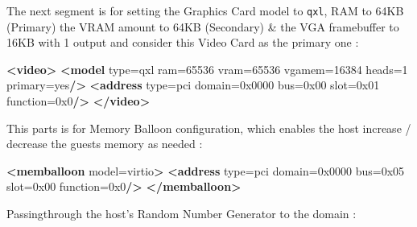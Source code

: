 \documentclass[
  14pt,
  english,
  a4paper,
]{scrreprt}
\newenvironment{Shaded}{}{}
\newcommand{\KeywordTok}[1]{\textcolor[rgb]{0.00,0.44,0.13}{\textbf{#1}}}
\newcommand{\OtherTok}[1]{\textcolor[rgb]{0.00,0.44,0.13}{#1}}
\newcommand{\StringTok}[1]{\textcolor[rgb]{0.25,0.44,0.63}{#1}}
\begin{document}
The next segment is for setting the Graphics Card model to \texttt{qxl},
RAM to 64KB (Primary) the VRAM amount to 64KB (Secondary) \& the VGA
framebuffer to 16KB with 1 output and consider this Video Card as the
primary one :

\begin{Shaded}
\begin{Highlighting}[]
\KeywordTok{\textless{}video\textgreater{}}
  \KeywordTok{\textless{}model}\OtherTok{ type=}\StringTok{\textquotesingle{}qxl\textquotesingle{}}\OtherTok{ ram=}\StringTok{\textquotesingle{}65536\textquotesingle{}}\OtherTok{ vram=}\StringTok{\textquotesingle{}65536\textquotesingle{}}\OtherTok{ vgamem=}\StringTok{\textquotesingle{}16384\textquotesingle{}}\OtherTok{ heads=}\StringTok{\textquotesingle{}1\textquotesingle{}}\OtherTok{ primary=}\StringTok{\textquotesingle{}yes\textquotesingle{}}\KeywordTok{/\textgreater{}}
  \KeywordTok{\textless{}address}\OtherTok{ type=}\StringTok{\textquotesingle{}pci\textquotesingle{}}\OtherTok{ domain=}\StringTok{\textquotesingle{}0x0000\textquotesingle{}}\OtherTok{ bus=}\StringTok{\textquotesingle{}0x00\textquotesingle{}}\OtherTok{ slot=}\StringTok{\textquotesingle{}0x01\textquotesingle{}}\OtherTok{ function=}\StringTok{\textquotesingle{}0x0\textquotesingle{}}\KeywordTok{/\textgreater{}}
\KeywordTok{\textless{}/video\textgreater{}}
\end{Highlighting}
\end{Shaded}

This parts is for Memory Balloon configuration, which enables the host
increase / decrease the guests memory as needed :

\begin{Shaded}
\begin{Highlighting}[]
\KeywordTok{\textless{}memballoon}\OtherTok{ model=}\StringTok{\textquotesingle{}virtio\textquotesingle{}}\KeywordTok{\textgreater{}}
  \KeywordTok{\textless{}address}\OtherTok{ type=}\StringTok{\textquotesingle{}pci\textquotesingle{}}\OtherTok{ domain=}\StringTok{\textquotesingle{}0x0000\textquotesingle{}}\OtherTok{ bus=}\StringTok{\textquotesingle{}0x05\textquotesingle{}}\OtherTok{ slot=}\StringTok{\textquotesingle{}0x00\textquotesingle{}}\OtherTok{ function=}\StringTok{\textquotesingle{}0x0\textquotesingle{}}\KeywordTok{/\textgreater{}}
\KeywordTok{\textless{}/memballoon\textgreater{}}
\end{Highlighting}
\end{Shaded}

Passingthrough the host's Random Number Generator to the domain :
\end{document}

